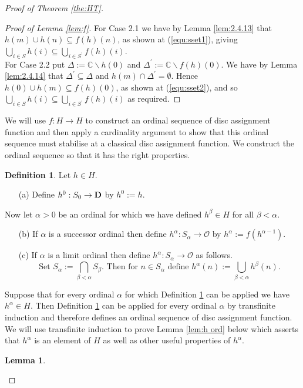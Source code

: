 \documentclass{strippedproc-l}
\newtheorem{lemma}[theorem]{Lemma}
\theoremstyle{definition}
\newtheorem{definition}[theorem]{Definition}
\theoremstyle{remark}
\numberwithin{equation}{section}
\begin{document}
\begin{proof}[Proof of Theorem \ref{the:HT}]
\begin{proof}[Proof of Lemma \ref{lem:f}]
For Case 2.1 we have by Lemma \ref{lem:2.4.13} that $h(m)\cup h(n)\subseteq f(h)(n)$, as shown at (\ref{equ:sset1}), giving $\bigcup_{i\in S}h(i)\subseteq\bigcup_{i\in S^{'}}f(h)(i)$.\\ For Case 2.2 put $\Delta:=\mathbb{C}\backslash h(0)$ and $\Delta^{'}:=\mathbb{C}\backslash f(h)(0)$. We have by Lemma \ref{lem:2.4.14} that $\Delta^{'}\subseteq\Delta$ and $h(m)\cap\Delta^{'}=\emptyset$. Hence $h(0)\cup h(m)\subseteq f(h)(0)$, as shown at (\ref{equ:sset2}), and so $\bigcup_{i\in S}h(i)\subseteq\bigcup_{i\in S^{'}}f(h)(i)$ as required.
\end{proof}
We will use $f:H\rightarrow H$ to construct an ordinal sequence of disc assignment function and then apply a cardinality argument to show that this ordinal sequence must stabilise at a classical disc assignment function. We construct the ordinal sequence so that it has the right properties.
\begin{definition}Let $h\in H$.
\begin{enumerate}
\item[\textup{(a)}]
Define $h^{0}:S_{0}\rightarrow\bf{D}$ by $h^{0}:=h$.
\end{enumerate}
Now let $\alpha>0$ be an ordinal for which we have defined $h^{\beta}\in H$ for all $\beta<\alpha$.
\begin{enumerate}
\item[\textup{(b)}]
If $\alpha$ is a successor ordinal then define $h^{\alpha}:S_{\alpha}\rightarrow\mathcal{O}$ by $h^{\alpha}:=f(h^{\alpha-1})$.
\item[\textup{(c)}]
If $\alpha$ is a limit ordinal then define $h^{\alpha}:S_{\alpha}\rightarrow\mathcal{O}$ as follows. 
\begin{equation*}
\mbox{Set } S_{\alpha}:=\bigcap_{\beta<\alpha}S_{\beta}. \mbox{ Then for } n\in S_{\alpha} \mbox{ define } h^{\alpha}(n):=\bigcup_{\beta<\alpha}h^{\beta}(n).
\end{equation*}
\end{enumerate}
\label{def:h ord}
\end{definition}
Suppose that for every ordinal $\alpha$ for which Definition \ref{def:h ord} can be applied we have $h^{\alpha}\in H$. Then Definition \ref{def:h ord} can be applied for every ordinal $\alpha$ by transfinite induction and therefore defines an ordinal sequence of disc assignment function. We will use transfinite induction to prove Lemma \ref{lem:h ord} below which asserts that $h^{\alpha}$ is an element of $H$ as well as other useful properties of $h^{\alpha}$.
\begin{lemma}

\end{lemma}
\end{proof}
\end{document}
